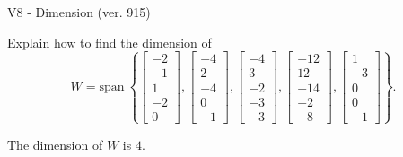 \begin{exercise}
  \begin{exerciseTitle}V8 - Dimension (ver. 915)\end{exerciseTitle}
  \begin{exerciseStatement}
    Explain how to find the dimension of 
\[W=\mathrm{span}\ \left\{\left[\begin{array}{r}
-2 \\
-1 \\
1 \\
-2 \\
0
\end{array}\right] , \left[\begin{array}{r}
-4 \\
2 \\
-4 \\
0 \\
-1
\end{array}\right] , \left[\begin{array}{r}
-4 \\
3 \\
-2 \\
-3 \\
-3
\end{array}\right] , \left[\begin{array}{r}
-12 \\
12 \\
-14 \\
-2 \\
-8
\end{array}\right] , \left[\begin{array}{r}
1 \\
-3 \\
0 \\
0 \\
-1
\end{array}\right]\right\}.\]



  \end{exerciseStatement}
  \begin{exerciseAnswer}
   The dimension of \(W\) is  \(4\).
  


  \end{exerciseAnswer}
\end{exercise}